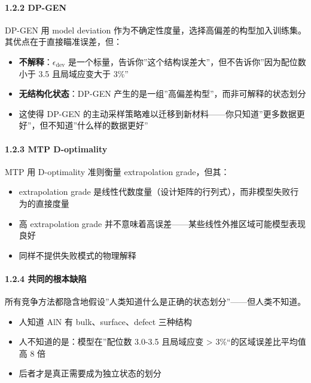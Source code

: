 \documentclass[
  12pt,
]{ctexart}
\providecommand{\tightlist}{%
  \setlength{\itemsep}{0pt}\setlength{\parskip}{0pt}}
\begin{document}
\paragraph{1.2.2 DP-GEN}\label{dp-gen}

DP-GEN 用 model deviation
作为不确定性度量，选择高偏差的构型加入训练集。其优点在于直接瞄准误差，但：

\begin{itemize}
\tightlist
\item
  \textbf{不解释}：\(\epsilon_{\text{dev}}\)
  是一个标量，告诉你''这个结构误差大''，但不告诉你''因为配位数小于 3.5
  且局域应变大于 3\%''
\item
  \textbf{无结构化状态}：DP-GEN
  产生的是一组''高偏差构型''，而非可解释的状态划分
\item
  这使得 DP-GEN
  的主动采样策略难以迁移到新材料------你只知道''更多数据更好''，但不知道''什么样的数据更好''
\end{itemize}

\paragraph{1.2.3 MTP D-optimality}\label{mtp-d-optimality}

MTP 用 D-optimality 准则衡量 extrapolation grade，但其：

\begin{itemize}
\tightlist
\item
  extrapolation grade
  是线性代数度量（设计矩阵的行列式），而非模型失败行为的直接度量
\item
  高 extrapolation grade
  并不意味着高误差------某些线性外推区域可能模型表现良好
\item
  同样不提供失败模式的物理解释
\end{itemize}

\paragraph{1.2.4
共同的根本缺陷}\label{ux5171ux540cux7684ux6839ux672cux7f3aux9677}

所有竞争方法都隐含地假设''人类知道什么是正确的状态划分''------但人类不知道。

\begin{itemize}
\tightlist
\item
  人知道 AlN 有 bulk、surface、defect 三种结构
\item
  人不知道的是：模型在''配位数 3.0-3.5 且局域应变 \textgreater{}
  3\%``的区域误差比平均值高 8 倍
\item
  后者才是真正需要成为独立状态的划分
\end{itemize}
\end{document}

